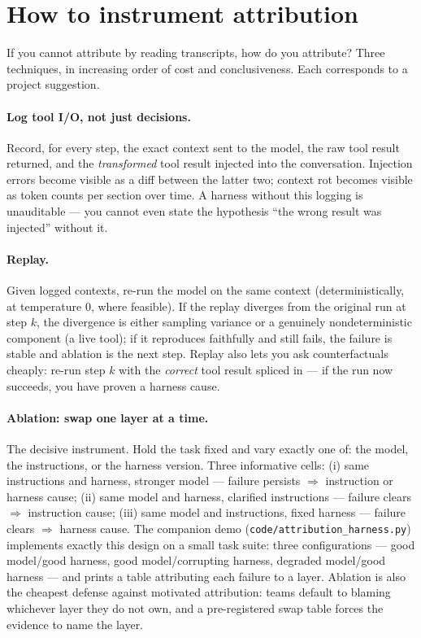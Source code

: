 \documentclass[11pt]{article}
\begin{document}
\section{How to instrument attribution}
If you cannot attribute by reading transcripts, how do you attribute? Three techniques, in increasing order of cost and conclusiveness. Each corresponds to a project suggestion.

\paragraph{Log tool I/O, not just decisions.} Record, for every step, the exact context sent to the model, the raw tool result returned, and the \emph{transformed} tool result injected into the conversation. Injection errors become visible as a diff between the latter two; context rot becomes visible as token counts per section over time. A harness without this logging is unauditable --- you cannot even state the hypothesis ``the wrong result was injected'' without it.

\paragraph{Replay.} Given logged contexts, re-run the model on the same context (deterministically, at temperature 0, where feasible). If the replay diverges from the original run at step $k$, the divergence is either sampling variance or a genuinely nondeterministic component (a live tool); if it reproduces faithfully and still fails, the failure is stable and ablation is the next step. Replay also lets you ask counterfactuals cheaply: re-run step $k$ with the \emph{correct} tool result spliced in --- if the run now succeeds, you have proven a harness cause.

\paragraph{Ablation: swap one layer at a time.} The decisive instrument. Hold the task fixed and vary exactly one of: the model, the instructions, or the harness version. Three informative cells: (i) same instructions and harness, stronger model --- failure persists $\Rightarrow$ instruction or harness cause; (ii) same model and harness, clarified instructions --- failure clears $\Rightarrow$ instruction cause; (iii) same model and instructions, fixed harness --- failure clears $\Rightarrow$ harness cause. The companion demo (\texttt{code/attribution\_harness.py}) implements exactly this design on a small task suite: three configurations --- good model/good harness, good model/corrupting harness, degraded model/good harness --- and prints a table attributing each failure to a layer. Ablation is also the cheapest defense against motivated attribution: teams default to blaming whichever layer they do not own, and a pre-registered swap table forces the evidence to name the layer.
\end{document}
